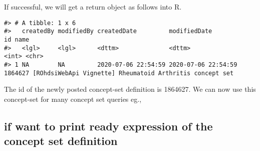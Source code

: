 \documentclass[
]{article}
\begin{document}
If successful, we will get a return object as follows into R.

\begin{verbatim}
#> # A tibble: 1 x 6
#>   createdBy modifiedBy createdDate         modifiedDate             id name                                                    
#>   <lgl>     <lgl>      <dttm>              <dttm>                <int> <chr>                                                   
#> 1 NA        NA         2020-07-06 22:54:59 2020-07-06 22:54:59 1864627 [ROhdsiWebApi Vignette] Rheumatoid Arthritis concept set
\end{verbatim}

The id of the newly posted concept-set definition is 1864627. We can now
use this concept-set for many concept set queries eg.,

\hypertarget{if-want-to-print-ready-expression-of-the-concept-set-definition}{%
\subsection{if want to print ready expression of the concept set
definition}\label{if-want-to-print-ready-expression-of-the-concept-set-definition}}
\end{document}
